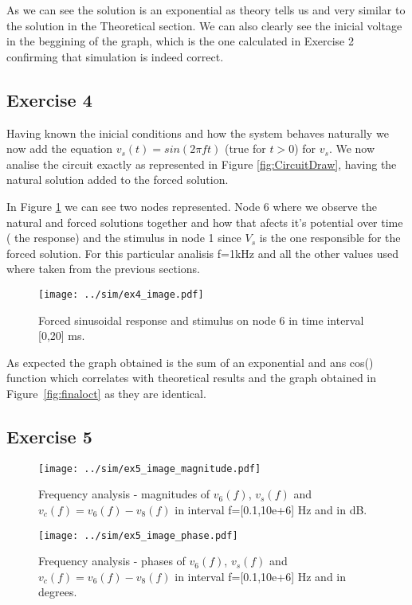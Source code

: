 As we can see the solution is an exponential as theory tells us and very similar to the solution in the Theoretical section. We can also clearly see the inicial voltage in the beggining of the graph, which is the one calculated in Exercise 2 confirming that simulation is indeed correct.

\subsection{Exercise 4} \label{sec:Ex4Sim}

Having known the inicial conditions and how the system behaves naturally we now add the equation $v_s(t)=sin(2 \pi f t)$ (true for $t>0$) for $v_s$. We now analise the circuit exactly as represented in Figure \ref{fig:CircuitDraw}, having the natural solution added to the forced solution.\par
In Figure \ref{fig:Ex4_Image} we can see two nodes represented. Node 6 where we observe the natural and forced solutions together and how that afects it's potential over time ( the response) and the stimulus in node 1 since $V_s$ is the one responsible for the forced solution. For this particular analisis f=1kHz and all the other values used where taken from the previous sections. 

\begin{figure}[H]
  \centering
  \texttt{[image: ../sim/ex4\_image.pdf]}
  \caption{Forced sinusoidal response and stimulus on node 6 in time interval [0,20] ms.}
  \label{fig:Ex4_Image}
\end{figure}


As expected the graph obtained is the sum of an exponential and ans cos() function which correlates with theoretical results and the graph obtained in Figure~\ref{fig:finaloct} as they are identical.

\subsection{Exercise 5} \label{sec:Ex5Sim}
 

\begin{figure}[H]
  \centering
  \texttt{[image: ../sim/ex5\_image\_magnitude.pdf]}
  \caption{Frequency analysis - magnitudes of $v_6(f)$, $v_s(f)$ and $v_c(f)=v_6(f)-v_8(f)$ in interval f=[0.1,10e+6] Hz and in dB.}
  \label{fig:Ex5_Image_Magnitude}
\end{figure}



\begin{figure}[H]
  \centering
  \texttt{[image: ../sim/ex5\_image\_phase.pdf]}
  \caption{Frequency analysis - phases of $v_6(f)$, $v_s(f)$ and $v_c(f)=v_6(f)-v_8(f)$ in interval f=[0.1,10e+6] Hz and in degrees.}
  \label{fig:Ex5_Image_Phase}
\end{figure}

